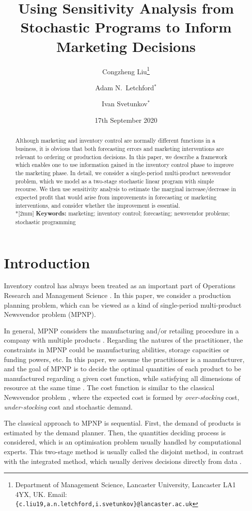 \documentclass[a4paper,11pt]{article}
\title{Using Sensitivity Analysis from Stochastic Programs to Inform Marketing Decisions}
\author{Congzheng Liu\thanks{Department of Management Science,
Lancaster University, Lancaster LA1 4YX, UK.
Email: {\tt \{c.liu19,a.n.letchford,i.svetunkov\}@lancaster.ac.uk}}
\and Adam N.\ Letchford$^*$ \and Ivan Svetunkov$^*$} %
\date{17th September 2020}
\begin{document}
\maketitle

\begin{abstract}
Although marketing and inventory control are normally different functions in a business, it is obvious that both forecasting errors and marketing interventions are relevant to ordering or production decisions. In this paper, we describe a framework which enables one to use information gained in the inventory control phase to improve the marketing phase. In detail, we consider a single-period multi-product newsvendor problem, which we model as a two-stage stochastic linear program with simple recourse. We then use sensitivity analysis to estimate the marginal increase/decrease in expected profit that would arise from improvements in forecasting or marketing interventions, and consider whether the improvement is essential.
\\*[2mm]
{\bf Keywords:} marketing; inventory control; forecasting; newsvendor problems; stochastic programming
\end{abstract}

\section{Introduction}
Inventory control has always been treated as an important part of Operations Research and Management Science \cite{Po02,SPP98,Zi00}. In this paper, we consider a production planning problem, which can be viewed as a kind of single-period multi-product
Newsvendor problem (MPNP)\cite{D98,TTV12}.

In general, MPNP considers the manufacturing and/or retailing procedure in a company with multiple products \cite{SPP98}. Regarding the natures of the practitioner, the constraints in MPNP could be manufacturing abilities, storage capacities or funding powers, etc. In this paper, we assume the practitioner is a manufacturer, and the goal of MPNP is to decide the optimal quantities of each product to be manufactured regarding a given cost function, while satisfying all dimensions of resource at the same time \cite{BDR12}. The cost function is similar to the classical Newsvendor problem \cite{Ch12}, where the expected cost is formed by \emph{over-stocking} cost, \emph{under-stocking} cost and stochastic demand.

The classical approach to MPNP is sequential. First, the demand of products is estimated by the demand planner. Then, the quantities deciding process is considered, which is an optimisation problem usually handled by computational experts. This two-stage method is usually called the disjoint method, in contrast with the integrated method, which usually derives decisions directly from data \cite{Sc58}. 
\end{document}
